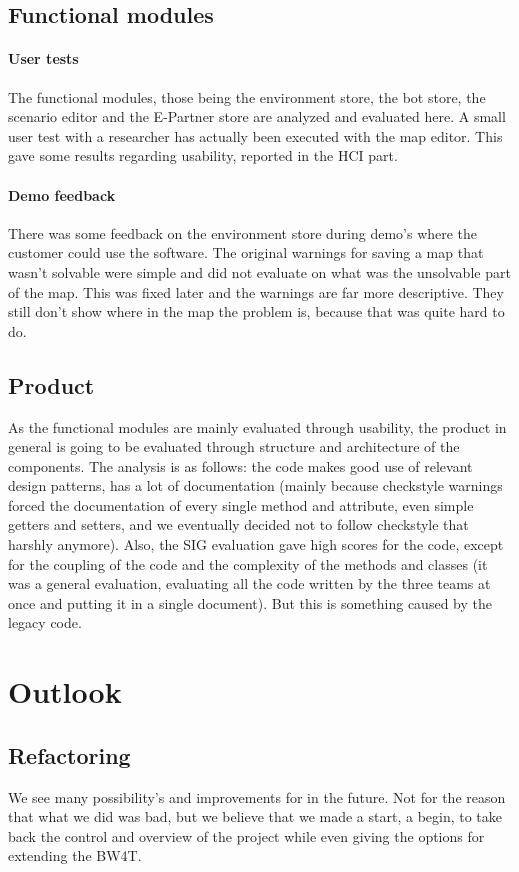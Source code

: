 \documentclass[]{article}
\begin{document}
\subsection{Functional modules}
\paragraph{User tests}
The functional modules, those being the environment store, the bot store, the scenario editor and the E-Partner store are analyzed and evaluated here. A small user test with a researcher has actually been executed with the map editor. This gave some results regarding usability, reported in the HCI part.
\paragraph{Demo feedback}
There was some feedback on the environment store during demo's where the customer could use the software. The original warnings for saving a map that wasn't solvable were simple and did not evaluate on what was the unsolvable part of the map. This was fixed later and the warnings are far more descriptive. They still don't show where in the map the problem is, because that was quite hard to do.
\subsection{Product}
As the functional modules are mainly evaluated through usability, the product in general is going to be evaluated through structure and architecture of the components. The analysis is as follows: the code makes good use of relevant design patterns, has a lot of documentation (mainly because checkstyle warnings forced the documentation of every single method and attribute, even simple getters and setters, and we eventually decided not to follow checkstyle that harshly anymore). Also, the SIG evaluation gave high scores for the code, except for the coupling of the code and the complexity of the methods and classes (it was a general evaluation, evaluating all the code written by the three teams at once and putting it in a single document). But this is something caused by the legacy code.
\section{Outlook}
\subsection{Refactoring}
We see many possibility's and improvements for in the future. Not for the reason that what we did was bad, but we believe that we made a start, a begin, to take back the control and overview of the project while even giving the options for extending the BW4T.
\end{document}
